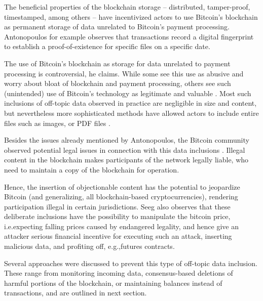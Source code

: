 \documentclass[a4paper,11pt,titlepage]{scrbook}
\begin{document}
The beneficial properties of the blockchain storage – distributed, tamper-proof, timestamped, among others – have incentivized actors to use Bitcoin's blockchain as permanent storage of data unrelated to Bitcoin's payment processing.
Antonopoulos for example observes that transactions record a digital fingerprint to establish a proof-of-existence for specific files on a specific date.

The use of Bitcoin's blockchain as storage for data unrelated to payment processing is controversial, he claims.
While some see this use as abusive and worry about bloat of blockchain and payment processing, others see such (unintended) use of Bitcoin's technology as legitimate and valuable \cite[155]{antonopoulos_mastering_2017}.
Most such inclusions of off-topic data observed in practice are negligible in size and content, but nevertheless more sophisticated methods have allowed actors to include entire files such as images, or PDF files \cite{matzutt_quantitative_2018}.

Besides the issues already mentioned by Antonopoulos, the Bitcoin community observed potential legal issues in connection with this data inclusions \cite{bitcoinwiki_weaknesses_2011}.
Illegal content in the blockchain makes participants of the network legally liable, who need to maintain a copy of the blockchain for operation.

Hence, the insertion of objectionable content has the potential to jeopardize Bitcoin (and generalizing, all blockchain-based cryptocurrencies), rendering participation illegal in certain jurisdictions.
Seeg \cite[1--2]{seeg_hardening_2018} also observes that these deliberate inclusions have the possibility to manipulate the bitcoin price, i.e.\@ expecting falling prices caused by endangered legality, and hence give an attacker serious financial incentive for executing such an attack, inserting malicious data, and profiting off, e.g.,\@ futures contracts.

Several approaches were discussed to prevent this type of off-topic data inclusion.
These range from monitoring incoming data, consensus-based deletions of harmful portions of the blockchain, or maintaining balances instead of transactions, and are outlined in next section. 
\end{document}
